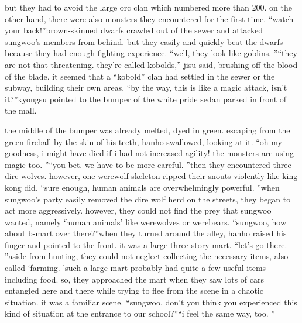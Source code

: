  but they had to avoid the large orc clan which numbered more than 200.
on the other hand, there were also monsters they encountered for the first time.
“watch your back!”brown-skinned dwarfs crawled out of the sewer and attacked sungwoo’s members from behind.
 but they easily and quickly beat the dwarfs because they had enough fighting experience.
“well, they look like goblins.
”“they are not that threatening.
 they’re called kobolds,” jisu said, brushing off the blood of the blade.
it seemed that a “kobold” clan had settled in the sewer or the subway, building their own areas.
“by the way, this is like a magic attack, isn’t it?”kyongsu pointed to the bumper of the white pride sedan parked in front of the mall.


the middle of the bumper was already melted, dyed in green.
escaping from the green fireball by the skin of his teeth, hanho swallowed, looking at it.
“oh my goodness, i might have died if i had not increased agility! the monsters are using magic too.
”“you bet.
 we have to be more careful.
”then they encountered three dire wolves.
 however, one werewolf skeleton ripped their snouts violently like king kong did.
“sure enough, human animals are overwhelmingly powerful.
”when sungwoo’s party easily removed the dire wolf herd on the streets, they began to act more aggressively.
 however, they could not find the prey that sungwoo wanted, namely ‘human animals’ like werewolves or werebears.
“sungwoo, how about b-mart over there?”when they turned around the alley, hanho raised his finger and pointed to the front.
it was a large three-story mart.
“let’s go there.
”aside from hunting, they could not neglect collecting the necessary items, also called ‘farming.
’such a large mart probably had quite a few useful items including food.
so, they approached the mart when they saw lots of cars entangled here and there while trying to flee from the scene in a chaotic situation.
 it was a familiar scene.
“sungwoo, don’t you think you experienced this kind of situation at the entrance to our school?”“i feel the same way, too.
”

 